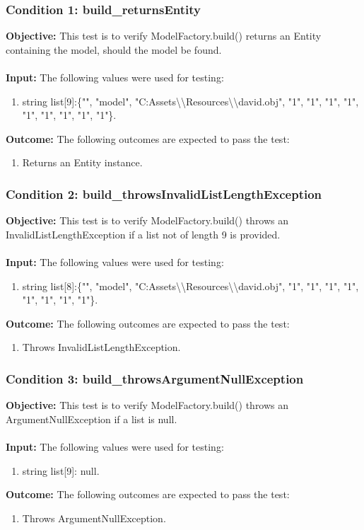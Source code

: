 \documentclass[a4paper,12pt]{article}
\begin{document}
		\subsubsection{Condition 1: build\_returnsEntity}
			\textbf{Objective:} This test is to verify ModelFactory.build() returns an Entity containing the model, should the model be found.\\\\
			\textbf{Input:} The following values were used for testing:
				\begin{enumerate}
					\item string list[9]:\{"", "model", "C:Assets\textbackslash \textbackslash Resources\textbackslash \textbackslash david.obj", "1", "1", "1", "1", "1", "1", "1", "1", "1"\}.
				\end{enumerate}
			\textbf{Outcome:} The following outcomes are expected to pass the test:
				\begin{enumerate}
					\item Returns an Entity instance.
				\end{enumerate}
		\subsubsection{Condition 2: build\_throwsInvalidListLengthException}
			\textbf{Objective:} This test is to verify ModelFactory.build() throws an InvalidListLengthException if a list not of length 9 is provided.\\\\
			\textbf{Input:} The following values were used for testing:
				\begin{enumerate}
					\item string list[8]:\{"", "model", "C:Assets\textbackslash \textbackslash Resources\textbackslash \textbackslash david.obj", "1", "1", "1", "1", "1", "1", "1", "1"\}.
				\end{enumerate}
			\textbf{Outcome:} The following outcomes are expected to pass the test:
				\begin{enumerate}
					\item Throws InvalidListLengthException.
				\end{enumerate}
		\subsubsection{Condition 3: build\_throwsArgumentNullException}
			\textbf{Objective:} This test is to verify ModelFactory.build() throws an ArgumentNullException if a list is null.\\\\
			\textbf{Input:} The following values were used for testing:
				\begin{enumerate}
					\item string list[9]: null.
				\end{enumerate}
			\textbf{Outcome:} The following outcomes are expected to pass the test:
				\begin{enumerate}
					\item Throws ArgumentNullException.
				\end{enumerate}
\end{document}
